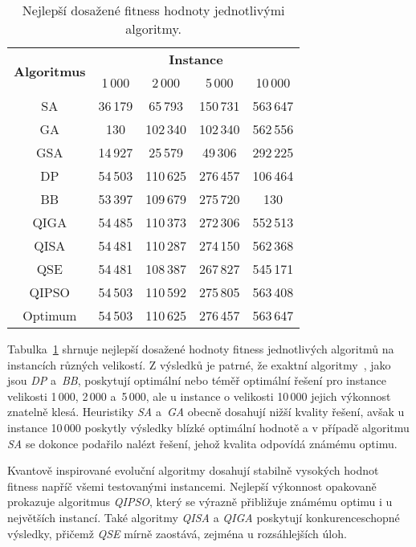 \begin{table}[ht]
    \centering
    \begin{tabular}{c c c c c}
        \toprule
        \multirow{2}{*}{\textbf{Algoritmus}} &
        \multicolumn{4}{c}{\textbf{Instance}} \\
        \cmidrule(lr){2-5}
              & 1\,000  & 2\,000   & 5\,000   & 10\,000 \\
        \midrule
        SA    & 36\,179 &  65\,793 & 150\,731 & 563\,647 \\[1ex]
        GA    &     130 & 102\,340 & 102\,340 & 562\,556 \\[1ex]
        GSA   & 14\,927 &  25\,579 &  49\,306 & 292\,225 \\[1ex]
        DP    & 54\,503 & 110\,625 & 276\,457 & 106\,464 \\[1ex]
        BB    & 53\,397 & 109\,679 & 275\,720 &      130 \\[1ex]
        QIGA  & 54\,485 & 110\,373 & 272\,306 & 552\,513 \\[1ex]
        QISA  & 54\,481 & 110\,287 & 274\,150 & 562\,368 \\[1ex]
        QSE   & 54\,481 & 108\,387 & 267\,827 & 545\,171 \\[1ex]
        QIPSO & 54\,503 & 110\,592 & 275\,805 & 563\,408 \\
        \midrule
        Optimum & 54\,503 & 110\,625 & 276\,457 & 563\,647 \\
        \bottomrule
    \end{tabular}
    \caption{Nejlepší dosažené fitness hodnoty jednotlivými algoritmy.}
    \label{tab:alg-comparison}
\end{table}

Tabulka~\ref{tab:alg-comparison} shrnuje nejlepší dosažené hodnoty fitness jednotlivých algoritmů na instancích různých velikostí.
Z výsledků je patrné, že exaktní algoritmy~\cite{compare}, jako jsou \emph{DP} a~\emph{BB}, poskytují optimální nebo téměř optimální řešení pro instance velikosti 1\,000, 2\,000 a~5\,000, ale u instance o velikosti 10\,000 jejich výkonnost znatelně klesá. 
Heuristiky \emph{SA} a~\emph{GA} obecně dosahují nižší kvality řešení, avšak u instance 10\,000 poskytly výsledky blízké optimální hodnotě a v případě algoritmu \emph{SA} se dokonce podařilo nalézt řešení, jehož kvalita odpovídá známému optimu.

Kvantově inspirované evoluční algoritmy dosahují stabilně vysokých hodnot fitness napříč všemi testovanými instancemi. Nejlepší výkonnost opakovaně prokazuje algoritmus \emph{QIPSO}, který se výrazně přibližuje známému optimu i u největších instancí.
Také algoritmy \emph{QISA} a \emph{QIGA} poskytují konkurenceschopné výsledky, přičemž \emph{QSE} mírně zaostává, zejména u rozsáhlejších úloh.
